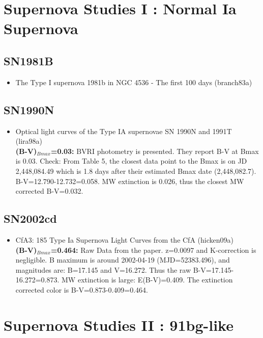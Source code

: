 
\section{Supernova Studies I : Normal Ia Supernova}
\subsection{\bf SN1981B}
\begin{itemize}
\item The Type I supernova 1981b in NGC 4536 - The first 100 days (branch83a)
\citet{branch83a}
\end{itemize}
\subsection{\bf SN1990N}
\begin{itemize}
\item Optical light curves of the Type IA supernovae SN 1990N and 1991T (lira98a)
\cite{lira98a}\\
{\bf (B-V)$_{Bmax}$=0.03:}
BVRI photometry is presented.  They report B-V at Bmax is 0.03.  Check: From Table
5, the closest data point to the Bmax is on JD 2,448,084.49 which is 1.8 days after
their estimated Bmax date (2,448,082.7). B-V=12.790-12.732=0.058.  MW extinction
is 0.026, thus the closest MW corrected B-V=0.032.
\end{itemize}


\subsection{\bf SN2002cd}
\begin{itemize}
\item CfA3: 185 Type Ia Supernova Light Curves from the CfA (hicken09a) 
\cite{hicken09a}\\
{\bf (B-V)$_{Bmax}$=0.464:}
Raw Data from the paper. z=0.0097 and K-correction is negligible.  
B maximum is around 2002-04-19 (MJD=52383.496), and magnitudes are:
B=17.145 and V=16.272.  Thus the raw B-V=17.145-16.272=0.873.
MW extinction is large: E(B-V)=0.409.  The extinction corrected
color is B-V=0.873-0.409=0.464.
\end{itemize}

\section{Supernova Studies II : 91bg-like}
